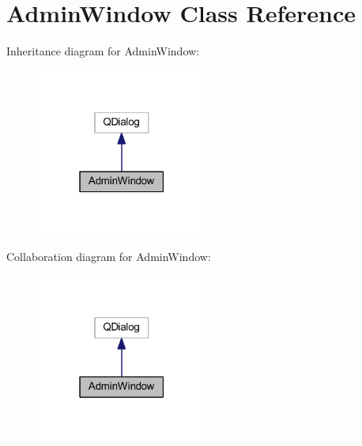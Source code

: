 \hypertarget{class_admin_window}{}\section{Admin\+Window Class Reference}
\label{class_admin_window}


Inheritance diagram for Admin\+Window\+:
\nopagebreak
\begin{figure}[H]
\begin{center}
\leavevmode
\includegraphics[width=159pt]{class_admin_window__inherit__graph}
\end{center}
\end{figure}


Collaboration diagram for Admin\+Window\+:
\nopagebreak
\begin{figure}[H]
\begin{center}
\leavevmode
\includegraphics[width=159pt]{class_admin_window__coll__graph}
\end{center}
\end{figure}

